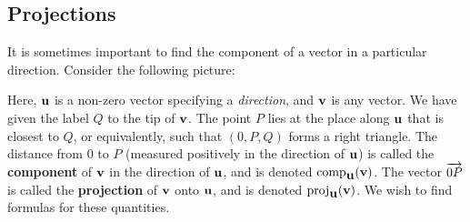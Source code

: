 \subsection{Projections}\label{ssec:projections}

It is sometimes important to find the component of a vector in a
particular direction. Consider the following picture:
\begin{center}
\end{center}
Here, $\mbox{\bf u}$ is a non-zero vector specifying a {\em direction},
and $\mbox{\bf v}$ is any vector. We have given the label $Q$ to the tip
of $\mbox{\bf v}$. The point $P$ lies at the place along $\mbox{\bf u}$ that
is closest to $Q$, or equivalently, such that $(0,P,Q)$ forms a right
triangle. The distance from $0$ to $P$ (measured positively in the
direction of $\mbox{\bf u}$) is called the \textbf{component}%
 of $\mbox{\bf v}$ in
the direction of $\mbox{\bf u}$, and is denoted
$\comp_{\vect{u}}(\vect{v})$. The vector $\overrightarrow{0P}$ is
called the \textbf{projection} of $\mbox{\bf v}$ onto $\mbox{\bf u}$,
and is denoted $\proj_{\vect{u}}(\vect{v})$. We wish to find
formulas for these quantities.

